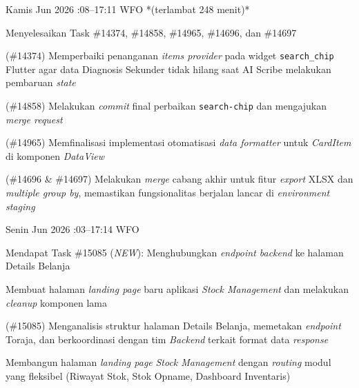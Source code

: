 \begin{logtable}
    {
        Kamis  Jun 2026 :08--17:11 \linebreak %
        WFO *(terlambat 248 menit)*
    }{
        \begin{loglist}
            \item Menyelesaikan Task \#14374, \#14858, \#14965, \#14696, dan \#14697
        \end{loglist}
    }{
        \begin{logwork}
            \item (\#14374) Memperbaiki penanganan \textit{items provider} pada widget \texttt{search\_chip} Flutter agar data Diagnosis Sekunder tidak hilang saat AI Scribe melakukan pembaruan \textit{state}
            \item (\#14858) Melakukan \textit{commit} final perbaikan \texttt{search-chip} dan mengajukan \textit{merge request}
            \item (\#14965) Memfinalisasi implementasi otomatisasi \textit{data formatter} untuk \textit{CardItem} di komponen \textit{DataView}
            \item (\#14696 \& \#14697) Melakukan \textit{merge} cabang akhir untuk fitur \textit{export} XLSX dan \textit{multiple group by}, memastikan fungsionalitas berjalan lancar di \textit{environment staging}
        \end{logwork}
    }


    {
        Senin  Jun 2026 :03--17:14 \linebreak %
        WFO
    }{
        \begin{loglist}
            \item Mendapat Task \#15085 (\textit{NEW}): Menghubungkan \textit{endpoint backend}
            ke halaman Details Belanja
            \item Membuat halaman \textit{landing page} baru aplikasi \textit{Stock Management}
            dan melakukan \textit{cleanup} komponen lama
        \end{loglist}
    }{
        \begin{logwork}
            \item (\#15085) Menganalisis struktur halaman Details Belanja, memetakan \textit{endpoint} Toraja, dan berkoordinasi dengan tim \textit{Backend} terkait format data \textit{response}
            \item Membangun halaman \textit{landing page} \textit{Stock Management} dengan
            \textit{routing} modul yang fleksibel (Riwayat Stok, Stok Opname, Dashboard
            Inventaris)
        \end{logwork}
    }


\end{logtable}
